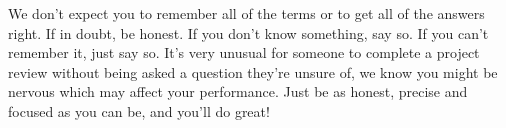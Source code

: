 \documentclass[11pt]{article}
\begin{document}
We don't expect you to remember all of the terms or to get all of the
answers right. If in doubt, be honest. If you don't know something, say
so. If you can't remember it, just say so. It's very unusual for someone
to complete a project review without being asked a question they're
unsure of, we know you might be nervous which may affect your
performance. Just be as honest, precise and focused as you can be, and
you'll do great!


    
    
    
    
\end{document}
